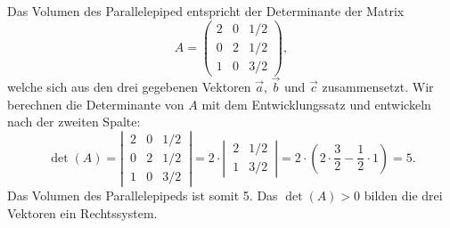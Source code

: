 
\begin{loesung}
Das Volumen des Parallelepiped entspricht der Determinante der Matrix 
\[
 A = \begin{pmatrix} 2 & 0 & 1/2\\ 0 & 2 & 1/2\\ 1 & 0 & 3/2\end{pmatrix},
\]
welche sich aus den drei gegebenen Vektoren $\vec a$, $\vec b$ und $\vec c$ zusammensetzt.
Wir berechnen die Determinante von $A$ mit dem Entwicklungssatz und entwickeln nach der zweiten Spalte:
\[
  \det(A) = \left|\,\begin{matrix} 2 & 0 & 1/2\\ 0 & 2 & 1/2\\ 1 & 0 & 3/2\end{matrix}\,\right| 
  = 2\cdot \left|\,\begin{matrix} 2 & 1/2\\ 1 & 3/2\end{matrix}\,\right| 
  = 2 \cdot(2\cdot \dfrac{3}{2}-\dfrac{1}{2}\cdot 1) 
  = 5.
\]
Das Volumen des Parallelepipeds ist somit 5. Das $\det(A) > 0$ bilden die drei Vektoren ein Rechtssystem.
\end{loesung}




